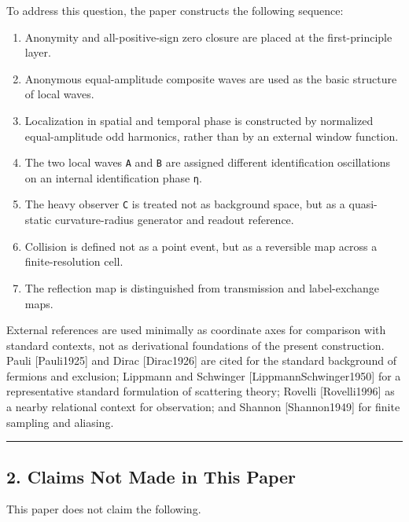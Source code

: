 \documentclass[
  a4paper,
]{article}
\providecommand{\tightlist}{%
  \setlength{\itemsep}{0pt}\setlength{\parskip}{0pt}}
\begin{document}
To address this question, the paper constructs the following sequence:

\begin{enumerate}
\def\labelenumi{\arabic{enumi}.}
\tightlist
\item
  Anonymity and all-positive-sign zero closure are placed at the
  first-principle layer.
\item
  Anonymous equal-amplitude composite waves are used as the basic
  structure of local waves.
\item
  Localization in spatial and temporal phase is constructed by
  normalized equal-amplitude odd harmonics, rather than by an external
  window function.
\item
  The two local waves \texttt{A} and \texttt{B} are assigned different
  identification oscillations on an internal identification phase
  \texttt{η}.
\item
  The heavy observer \texttt{C} is treated not as background space, but
  as a quasi-static curvature-radius generator and readout reference.
\item
  Collision is defined not as a point event, but as a reversible map
  across a finite-resolution cell.
\item
  The reflection map is distinguished from transmission and
  label-exchange maps.
\end{enumerate}

External references are used minimally as coordinate axes for comparison
with standard contexts, not as derivational foundations of the present
construction. Pauli {[}Pauli1925{]} and Dirac {[}Dirac1926{]} are cited
for the standard background of fermions and exclusion; Lippmann and
Schwinger {[}LippmannSchwinger1950{]} for a representative standard
formulation of scattering theory; Rovelli {[}Rovelli1996{]} as a nearby
relational context for observation; and Shannon {[}Shannon1949{]} for
finite sampling and aliasing.

\begin{center}\rule{0.5\linewidth}{0.5pt}\end{center}

\subsection{2. Claims Not Made in This
Paper}\label{claims-not-made-in-this-paper}

This paper does not claim the following.
\end{document}
